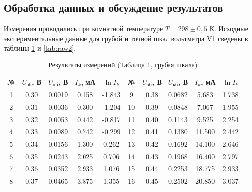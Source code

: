 \subsection{Обработка данных и обсуждение результатов}
Измерения проводились при комнатной температуре $T = 298 \pm 0,5$ К. Исходные экспериментальные данные для грубой и точной шкал вольтметра V1 сведены в таблицы \ref{tab:raw1} и \ref{tab:raw2}.

\begin{table}[ht!]
\centering
\caption{Результаты измерений (Таблица 1, грубая шкала)}
\label{tab:raw1}
\small
\begin{tabular}{|c|c|c|c|c||c|c|c|c|c|}
\hline
№ & $U_{эб}$, В & $U_{кб}$, В & $I_k$, мА & $\ln I_k$ & № & $U_{эб}$, В & $U_{кб}$, В & $I_k$, мА & $\ln I_k$ \\ \hline
1 & 0.30 & 0.0019 & 0.158 & -1.843 & 9  & 0.38 & 0.0682 & 5.683 & 1.738 \\ \hline
2 & 0.31 & 0.0036 & 0.300 & -1.204 & 10 & 0.39 & 0.0848 & 7.067 & 1.955 \\ \hline
3 & 0.32 & 0.0053 & 0.442 & -0.817 & 11 & 0.40 & 0.1143 & 9.525 & 2.254 \\ \hline
4 & 0.33 & 0.0089 & 0.742 & -0.299 & 12 & 0.41 & 0.1380 & 11.500 & 2.442 \\ \hline
5 & 0.34 & 0.0156 & 1.300 & 0.262  & 13 & 0.42 & 0.1692 & 14.100 & 2.646 \\ \hline
6 & 0.35 & 0.0243 & 2.025 & 0.706  & 14 & 0.43 & 0.1968 & 16.400 & 2.797 \\ \hline
7 & 0.36 & 0.0352 & 2.933 & 1.076  & 15 & 0.44 & 0.2253 & 18.775 & 2.933 \\ \hline
8 & 0.37 & 0.0465 & 3.875 & 1.355  & 16 & 0.45 & 0.2502 & 20.850 & 3.037 \\ \hline
\end{tabular}
\end{table}

